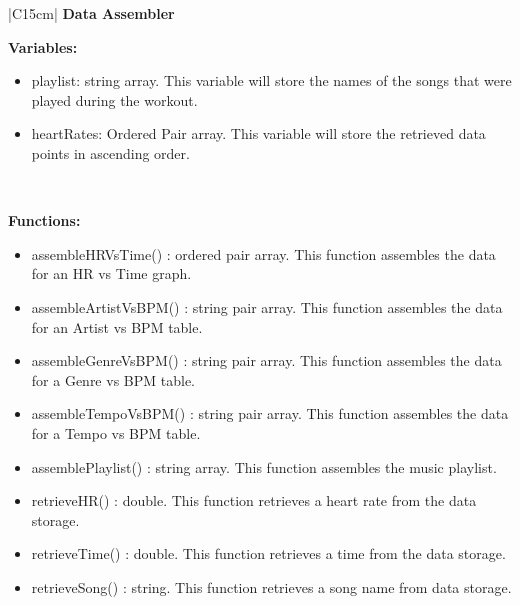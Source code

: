 \documentclass[letterpaper,english, 12pt]{scrreprt}
\begin{document}
\begin{center}
        \begin{tabular}{|C{15cm}|}
                \hline
                        \textbf{Data Assembler} \\
                \hline
                        \begin{flushleft}
                                \textbf{Variables:} \\
                        \end{flushleft}
                                \begin{itemize}
                                        \item playlist: string array. This variable will store the names of the songs that were played during the workout.
                                        \item heartRates: Ordered Pair array. This variable will store the retrieved data points in ascending order.
                                \end{itemize} \\
                        \hline
                        \begin{flushleft}
                                \textbf{Functions: } \\
                        \end{flushleft}
                                \begin{itemize}
                                        \item assembleHRVsTime() : ordered pair array. This function assembles the data for an HR vs Time graph.
                                        \item assembleArtistVsBPM() : string pair array. This function assembles the data for an Artist vs BPM table.
                                        \item assembleGenreVsBPM() : string pair array. This function assembles the data for a Genre vs BPM table.
                                        \item assembleTempoVsBPM() : string pair array. This function assembles the data for a Tempo vs BPM table.
                                        \item assemblePlaylist() : string array. This function assembles the music playlist.
                                        \item retrieveHR() : double. This function retrieves a heart rate from the data storage.
                                        \item retrieveTime() : double. This function retrieves a time from the data storage.
                                        \item retrieveSong() : string. This function retrieves a song name from data storage.
                                \end{itemize} \\
                        \hline
        \end{tabular}
\end{center}
\end{document}

